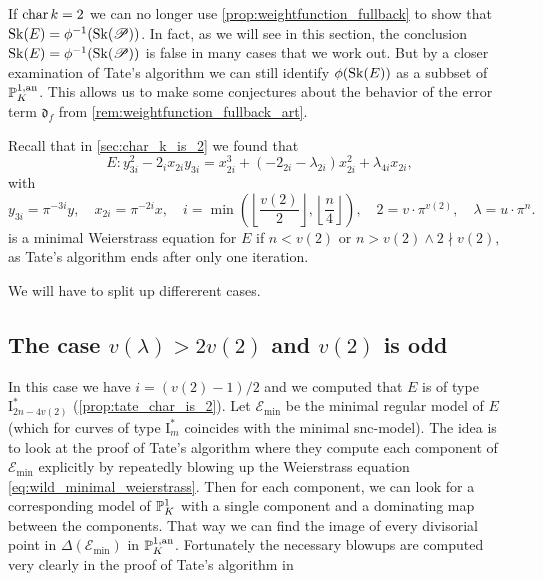 If $\operatorname{char} k =2$ we can no longer use \cref{prop:weightfunction_fullback} to show that  $\sk(E) = \phi^{-1}(\sk(\mathscr P))$. 
In fact, as we will see in this section, the conclusion $\sk(E) = \phi^{-1}(\sk(\mathscr P))$ is false in many cases that we work out.  
But by a closer examination of Tate's algorithm we can still identify $\phi(\sk(E))$ as a subbset of $ \mathbb{P}_K^{1, \text{an}}$. 
This allows us to make some conjectures about the behavior of the error term $\mathfrak{d}_f$ from \cref{rem:weightfunction_fullback_art}. 


Recall that in \cref{sec:char_k_is_2} we found that \begin{equation}\label{eq:wild_minimal_weierstrass}
E: y_{3i}^2 - 2_i x_{2i} y_{3i} = x_{2i}^3 + (-2_{2i} - \lambda_{2i}) x_{2i}^2 + \lambda_{4i} x_{2i}
,\end{equation} 
with \[
	y_{3i} = \pi^{-3i} y,\quad x_{2i} = \pi^{-2i} x, \quad i = \min\left( \left\lfloor \frac{v(2)}{2}\right\rfloor, \left\lfloor \frac{n}{4} \right\rfloor  \right), \quad 2 = v\cdot \pi^{v(2)},\quad  \lambda = u \cdot \pi^{n}
.\] 
is a minimal Weierstrass equation for $E$ if $n < v(2)$ or $n > v(2) \wedge 2 \nmid v(2)$, as Tate's algorithm ends after only one iteration. 

We will have to split up differerent cases. 
\subsection{The case $v(\lambda) > 2v(2)$ and $v(2)$ is odd} \label{sec:case_v_lambda_>_2_v_2_and_v_2_is_even}
In this case we have $i = (v(2) - 1) / 2$ and we computed that $E$ is of type $\mathrm I_{2n - 4v(2)}^*$ (\cref{prop:tate_char_is_2}).
Let $\mathscr E_\text{min} $ be the minimal regular model of $E$ (which for curves of type $\mathrm I_m^*$ coincides with the minimal snc-model).
The idea is to look at the proof of Tate's algorithm where they compute each component of $\mathscr E_\text{min} $ explicitly by repeatedly blowing up the Weierstrass equation \eqref{eq:wild_minimal_weierstrass}. 
Then for each component, we can look for a corresponding model of $\mathbb{P}^{1}_K$ with a single component and a dominating map between the components. 
That way we can find the image of every divisorial point in $\Delta(\mathscr E_\text{min} )$ in $\mathbb{P}^{1, \text{an}}_K$. 
Fortunately the necessary blowups are computed very clearly in the proof of Tate's algorithm in \cite[p.\ 369-379]{silvermanAdvancedTopicsArithmetic1994}

